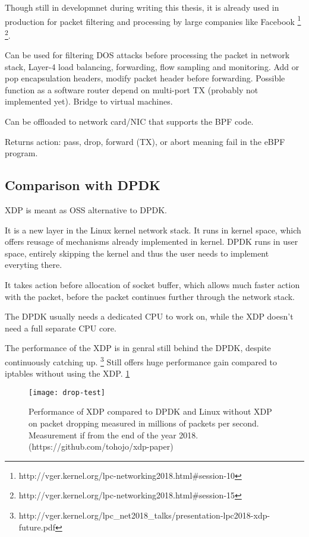 Though still in developmnet during writing this thesis, it is already used in production for packet filtering and processing by large companies like Facebook
\footnote{http://vger.kernel.org/lpc-networking2018.html\#session-10}
\footnote{http://vger.kernel.org/lpc-networking2018.html\#session-15}.

Can be used for filtering DOS attacks before processing the packet in network stack, Layer-4 load balancing, forwarding, flow sampling and monitoring.
Add or pop encapsulation headers, modify packet header before forwarding.
Possible function as a software router depend on multi-port TX (probably not implemented yet).
Bridge to virtual machines.

Can be offloaded to network card/NIC that supports the BPF code.

Returns action: pass, drop, forward (TX), or abort meaning fail in the eBPF program.


\subsection{Comparison with DPDK}
XDP is meant as OSS alternative to DPDK.

It is a new layer in the Linux kernel network stack.
It runs in kernel space, which offers reusage of mechanisms already implemented in kernel.
DPDK runs in user space, entirely skipping the kernel and thus the user needs to implement everyting there.

It takes action before allocation of socket buffer, which allows much faster action with the packet, before the packet continues further through the network stack.

The DPDK usually needs a dedicated CPU to work on, while the XDP doesn't need a full separate CPU core.

The performance of the XDP is in genral still behind the DPDK, despite continuously catching up.
\footnote{http://vger.kernel.org/lpc\_net2018\_talks/presentation-lpc2018-xdp-future.pdf}
Still offers huge performance gain compared to iptables without using the XDP.
\ref{fig:drop-test}

\begin{figure}
  \centering
  \texttt{[image: drop-test]}
  \caption{Performance of XDP compared to DPDK and Linux without XDP on packet dropping measured in millions of packets per second. Measurement if from the end of the year 2018. (https://github.com/tohojo/xdp-paper)}
  \label{fig:drop-test}
\end{figure}
